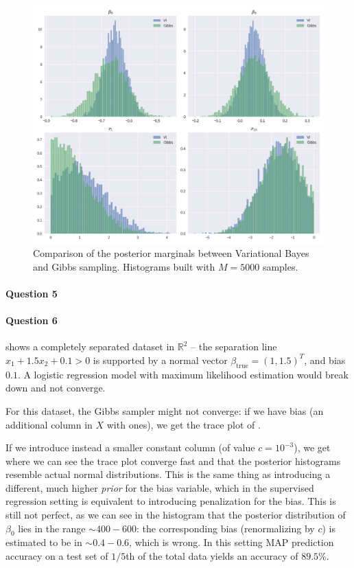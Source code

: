 \documentclass[11pt]{article}
\newcommand\RR{\mathbb{R}}
\begin{document}
\begin{figure}[h]
	\centering
	\includegraphics[width=.75\linewidth]{images/posterior_VI_Gibbs_comparison_1.png}
	\caption{Comparison of the posterior marginals between Variational Bayes and Gibbs sampling. Histograms built with $M=5000$ samples.}\label{fig:VBGibbsPosteriorComparison}
\end{figure}

\paragraph{Question 5}


\paragraph{Question 6}


 shows a completely separated dataset in $\RR^2$ -- the separation line $x_1 + 1.5x_2 + 0.1 > 0$ is supported by a normal vector $\beta_\mathrm{true} = (1, 1.5)^T$, and bias $0.1$. A logistic regression model with maximum likelihood estimation would break down and not converge.

For this dataset, the Gibbs sampler might not converge: if we have bias (an additional column in $X$ with ones), we get the trace plot of .

If we introduce instead a smaller constant column (of value $c = 10^{-3}$), we get  where we can see the trace plot converge fast and that the posterior histograms resemble actual normal distributions.
This is the same thing as introducing a different, much higher \textit{prior} for the bias variable, which in the supervised regression setting is equivalent to introducing penalization for the bias. This is still not perfect, as we can see in the histogram that the posterior distribution of $\beta_0$ lies in the range $\sim 400-600$: the corresponding bias (renormalizing by $c$) is estimated to be in $\sim 0.4-0.6$, which is wrong. In this setting MAP prediction accuracy on a test set of $1/5$th of the total data yields an accuracy of $89.5\%$.
\end{document}
